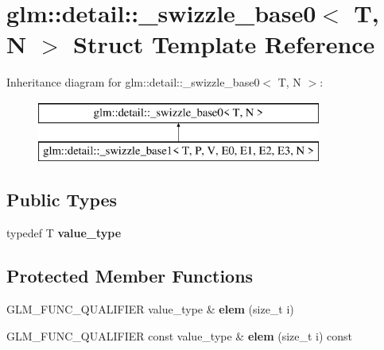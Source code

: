 \hypertarget{structglm_1_1detail_1_1__swizzle__base0}{}\section{glm\+:\+:detail\+:\+:\+\_\+swizzle\+\_\+base0$<$ T, N $>$ Struct Template Reference}
\label{structglm_1_1detail_1_1__swizzle__base0}
Inheritance diagram for glm\+:\+:detail\+:\+:\+\_\+swizzle\+\_\+base0$<$ T, N $>$\+:\begin{figure}[H]
\begin{center}
\leavevmode
\includegraphics[height=2.000000cm]{structglm_1_1detail_1_1__swizzle__base0}
\end{center}
\end{figure}
\subsection*{Public Types}
\begin{DoxyCompactItemize}
\item 
typedef T {\bfseries value\+\_\+type}\hypertarget{structglm_1_1detail_1_1__swizzle__base0_ad38a739e1fe6d2db2674f34c98159c8f}{}\label{structglm_1_1detail_1_1__swizzle__base0_ad38a739e1fe6d2db2674f34c98159c8f}

\end{DoxyCompactItemize}
\subsection*{Protected Member Functions}
\begin{DoxyCompactItemize}
\item 
G\+L\+M\+\_\+\+F\+U\+N\+C\+\_\+\+Q\+U\+A\+L\+I\+F\+I\+ER value\+\_\+type \& {\bfseries elem} (size\+\_\+t i)\hypertarget{structglm_1_1detail_1_1__swizzle__base0_aebd942a3c3289f9876a9ede4d710d8f0}{}\label{structglm_1_1detail_1_1__swizzle__base0_aebd942a3c3289f9876a9ede4d710d8f0}

\item 
G\+L\+M\+\_\+\+F\+U\+N\+C\+\_\+\+Q\+U\+A\+L\+I\+F\+I\+ER const value\+\_\+type \& {\bfseries elem} (size\+\_\+t i) const \hypertarget{structglm_1_1detail_1_1__swizzle__base0_a9fb7f491860415b292864d0693d8bdb8}{}\label{structglm_1_1detail_1_1__swizzle__base0_a9fb7f491860415b292864d0693d8bdb8}

\end{DoxyCompactItemize}
